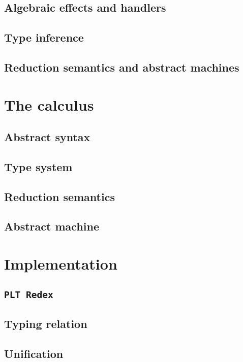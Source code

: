 \documentclass[inz, english, shortabstract]{iithesis}
\newcommand{\Redex}{\texttt{PLT Redex} }
\begin{document}
\section{Algebraic effects and handlers}

\section{Type inference}

\section{Reduction semantics and abstract machines}


\chapter{The calculus}

\section{Abstract syntax}

\section{Type system}

\section{Reduction semantics}

\section{Abstract machine}


\chapter{Implementation}

\section{\Redex}

\section{Typing relation}

\section{Unification}
\end{document}
